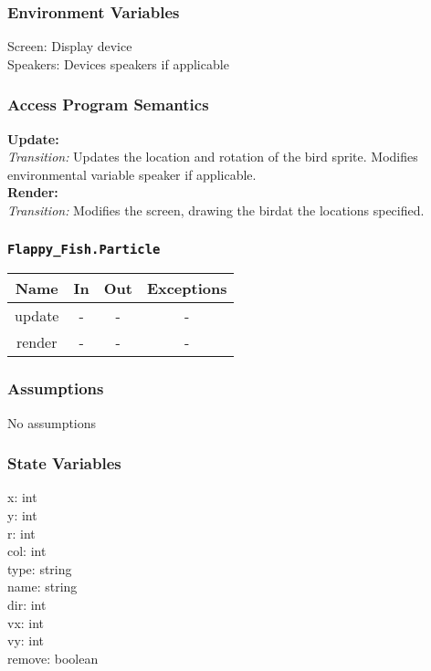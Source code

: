 \documentclass[11pt, oneside]{article}   	%
\begin{document}
\subsubsection*{Environment Variables}
Screen: Display device\\
Speakers: Devices speakers if applicable\\


\subsubsection*{Access Program Semantics} 
 \textbf{Update:}  \\
 \textit{Transition:} Updates the location and rotation of the bird sprite. Modifies environmental variable speaker if applicable.\\
 \textbf{Render:}  \\
 \textit{Transition:} Modifies the screen, drawing the birdat the locations specified.\\

\subsubsection*{\texttt{Flappy\_Fish.Particle}}



\begin{center}
\begin{tabular}{ |c|c|c|c| } 
 \hline
 Name & In & Out & Exceptions \\ 
 \hline \hline
 update & - & - & - \\ 
render &  -& - & - \\ 
 \hline
\end{tabular}
\end{center}

\subsubsection*{Assumptions}
No assumptions

\subsubsection*{State Variables}
x: int\\
y: int\\
r: int \\
col: int \\
type: string\\
name: string \\
dir: int\\
vx: int \\
vy: int \\
remove: boolean \\
\end{document}
